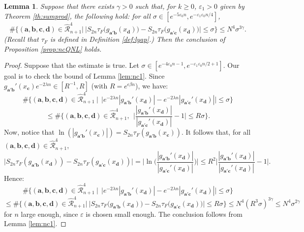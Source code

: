 \documentclass[a4paper]{article}
\newtheorem{lemma}[theorem]{Lemma}
\theoremstyle{definition}
\begin{document}
\begin{lemma}\label{lem:nc2}
Suppose that there exists $\gamma>0$ such that, for $k\geq 0$, $\varepsilon_1>0$ given by Theorem \ref{th:sumprod}, the following hold: for all $\sigma \in [e^{-5 \varepsilon_0 n}, e^{-\varepsilon_1 \varepsilon_0 n/4}]$,
$$  \# \Big\{ (\mathbf{a},\mathbf{b},\mathbf{c},\mathbf{d}) \in \widehat{\mathcal{R}}_{n+1}^4  \Big| \  \big|S_{2n} \tau_F\big( g_{\mathbf{a}'\mathbf{b}}(x_\mathbf{d}) \big) - S_{2n} \tau_F\big( g_{\mathbf{a}'\mathbf{c}}(x_\mathbf{d}) \big) \big| \leq \sigma \Big\} \leq N^4 \sigma^{3 \gamma} .$$
(Recall that $\tau_F$ is defined in Definition \ref{def:lyap}.) Then the conclusion of Proposition \ref{prop:ncQNL} holds.
\end{lemma}

\begin{proof}
Suppose that the estimate is true.
Let $\sigma \in [e^{-4 \varepsilon_0 n-1}, e^{-\varepsilon_1 \varepsilon_0 n/2 +1}]$.
Our goal is to check the bound of Lemma \ref{lem:nc1}. Since $g_{\mathbf{a}'\mathbf{b}}'(x_\mathbf{c})e^{- 2 \lambda n} \in [R^{-1},R]$ (with $R = e^{\epsilon \beta n}$), we have:
$$  \#\Big\{ (\mathbf{a},\mathbf{b},\mathbf{c},\mathbf{d}) \in \widehat{\mathcal{R}}_{n+1}^4 \ \Big| \  \ \big|e^{-2 \lambda n} |g_{\mathbf{a}'\mathbf{b}}'(x_{\mathbf{d}})| - e^{-2 \lambda n} |g_{\mathbf{a}'\mathbf{c}}'(x_{\mathbf{d}})| \big| \leq \sigma \Big\}   $$
$$ \leq \#\Big\{ (\mathbf{a},\mathbf{b},\mathbf{c},\mathbf{d}) \in \widehat{\mathcal{R}}_{n+1}^4  , \  \ \Big| \frac{|g_{\mathbf{a}'\mathbf{b}}'(x_{\mathbf{d}})|}{|g_{\mathbf{a}'\mathbf{c}}'(x_{\mathbf{d}})|} - 1 \Big| \leq R \sigma \Big\} .$$
Now, notice that $\ln(|g_{\mathbf{a}'\mathbf{b}}'(x_\mathbf{c})|) = S_{2n} \tau_F(g_{\mathbf{a}'\mathbf{b}}(x_\mathbf{c}))$. It follows that, for all $(\mathbf{a},\mathbf{b},\mathbf{c},\mathbf{d}) \in \widehat{\mathcal{R}}_{n+1}^4$,
$$ \Big| S_{2n} \tau_F(g_{\mathbf{a}'\mathbf{b}}(x_\mathbf{d})) - S_{2n} \tau_F(g_{\mathbf{a}'\mathbf{c}}(x_\mathbf{d})) \Big| = \Big|\ln \Big( \frac{|g_{\mathbf{a}'\mathbf{b}}'(x_{\mathbf{d}})|}{|g_{\mathbf{a}'\mathbf{c}}'(x_{\mathbf{d}})|} \Big) \Big| \leq R^2 \Big| \frac{|g_{\mathbf{a}'\mathbf{b}}'(x_{\mathbf{d}})|}{|g_{\mathbf{a}'\mathbf{c}}'(x_{\mathbf{d}})|} - 1 \Big|. $$
Hence:
$$ \#\Big\{ (\mathbf{a},\mathbf{b},\mathbf{c},\mathbf{d}) \in \widehat{\mathcal{R}}_{n+1}^4 \ \Big| \  \ \big|e^{-2 \lambda n} |g_{\mathbf{a}'\mathbf{b}}'(x_{\mathbf{d}})| - e^{-2 \lambda n} |g_{\mathbf{a}'\mathbf{c}}'(x_{\mathbf{d}})| \big| \leq \sigma \Big\}   $$
$$ \leq \# \Big\{ (\mathbf{a},\mathbf{b},\mathbf{c},\mathbf{d}) \in \widehat{\mathcal{R}}_{n+1}^4  \Big| \  \big|S_{2n} \tau_F\big( g_{\mathbf{a}'\mathbf{b}}(x_\mathbf{d}) \big) - S_{2n} \tau_F\big( g_{\mathbf{a}'\mathbf{c}}(x_\mathbf{d}) \big) \big| \leq R \sigma \Big\}
\leq N^4 (R^3 \sigma)^{3 \gamma} \leq N^4 \sigma^{2 \gamma}$$
for $n$ large enough, since $\varepsilon$ is chosen small enough. The conclusion follows from Lemma \ref{lem:nc1}. \end{proof}
\end{document}
